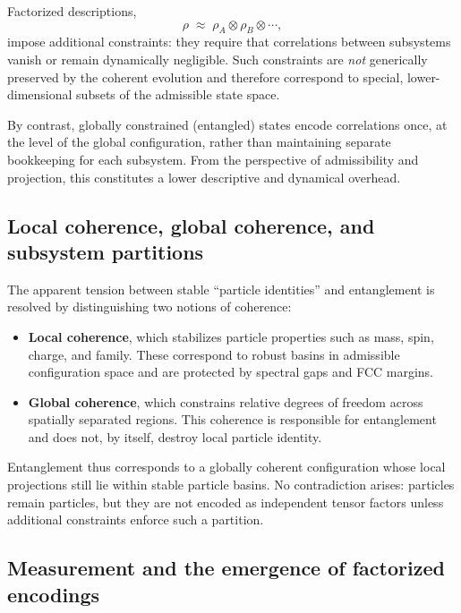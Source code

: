 \documentclass[11pt]{article}
\begin{document}
Factorized descriptions,
\[
\rho \;\approx\; \rho_A \otimes \rho_B \otimes \cdots ,
\]
impose additional constraints: they require that correlations between subsystems vanish or
remain dynamically negligible. Such constraints are \emph{not} generically preserved by the
coherent evolution and therefore correspond to special, lower-dimensional subsets of the
admissible state space.

By contrast, globally constrained (entangled) states encode correlations once, at the level
of the global configuration, rather than maintaining separate bookkeeping for each subsystem.
From the perspective of admissibility and projection, this constitutes a lower descriptive
and dynamical overhead.

\subsection{Local coherence, global coherence, and subsystem partitions}
\label{sec:local_global_coherence}

The apparent tension between stable ``particle identities'' and entanglement is resolved by
distinguishing two notions of coherence:

\begin{itemize}
\item \textbf{Local coherence}, which stabilizes particle properties such as mass, spin,
charge, and family. These correspond to robust basins in admissible configuration space and
are protected by spectral gaps and FCC margins.

\item \textbf{Global coherence}, which constrains relative degrees of freedom across spatially
separated regions. This coherence is responsible for entanglement and does not, by itself,
destroy local particle identity.
\end{itemize}

Entanglement thus corresponds to a globally coherent configuration whose local projections
still lie within stable particle basins. No contradiction arises: particles remain particles,
but they are not encoded as independent tensor factors unless additional constraints enforce
such a partition.

\subsection{Measurement and the emergence of factorized encodings}
\label{sec:measurement_partition}
\end{document}

